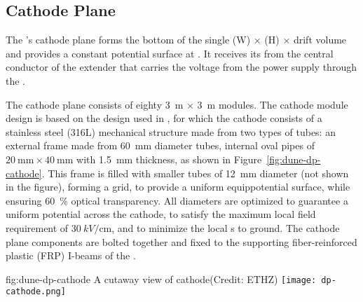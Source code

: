 \subsection{Cathode Plane}

The \dpmod{}'s cathode plane forms the  bottom of the single 
\dptpcwdth (W) $\times$ \tpcheight (H) $\times$ \dptpclen
drift volume and provides a constant potential surface at \dptargetdriftvoltneg{}.  It receives its  from the central conductor of the extender that carries the voltage from the power supply through the  \fdth.  

The cathode plane consists of eighty \SI{3}{\m} $\times$ \SI{3}{\m} modules. 
The cathode module design is based on the design used in  , for which the cathode consists of a stainless steel (316L) mechanical structure 
made from two types of tubes: 
an external frame made from \SI{60}{\milli\m} diameter tubes, internal oval pipes of $\SI{20}{\milli\m}\times \SI{40}{\milli\m}$ with \SI{1.5}{mm} thickness, as shown in Figure~\ref{fig:dune-dp-cathode}. 
This frame is filled with smaller tubes of \SI{12}{\milli\m} diameter (not shown in the figure), forming a grid, to provide a uniform equippotential surface, while ensuring \SI{60}{\%} optical transparency. All diameters are optimized to guarantee a uniform potential across the cathode, to satisfy the maximum local field requirement of $\SI{30}{kV/\centi\m}$, and to minimize the local \efield{}s to ground. 
The cathode plane components are bolted together and fixed to the supporting  fiber-reinforced plastic (FRP) I-beams of the . 


\begin{dunefigure}{fig:dune-dp-cathode}
{A cutaway view of  cathode(Credit: ETHZ)}
\texttt{[image: dp-cathode.png]}
\end{dunefigure}

